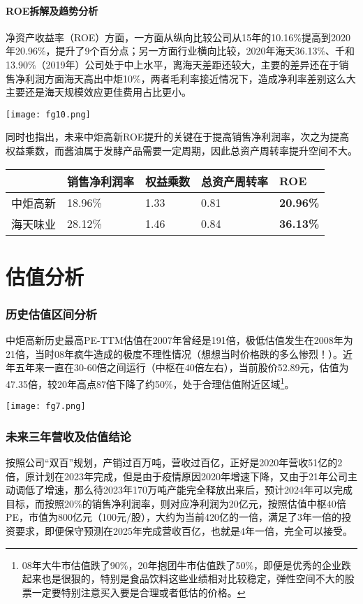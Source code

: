 \documentclass[UTF8,a4paper,zihao=-4,fontset = windows]{ctexart} %
\begin{document}
\subsection{ROE拆解及趋势分析}
净资产收益率（ROE）方面，一方面从纵向比较公司从15年的10.16\%提高到2020年20.96\%，提升了9个百分点；另一方面行业横向比较，2020年海天36.13\%、千和13.90\%（2019年）公司处于中上水平，离海天差距还较大，主要的差异还在于销售净利润方面海天高出中炬10\%，两者毛利率接近情况下，造成净利率差别这么大主要还是海天规模效应更佳费用占比更小。

\texttt{[image: fg10.png]} 

同时也指出，未来中炬高新ROE提升的关键在于提高销售净利润率，次之为提高权益乘数，而酱油属于发酵产品需要一定周期，因此总资产周转率提升空间不大。

\begin{tabular}{rllll}
    \multicolumn{1}{l}{\textbf{}} & \textbf{销售净利润率} & \textbf{权益乘数} & \textbf{总资产周转率} & \textbf{ROE}     \\
    \hline
    中炬高新                          & 18.96\%         & 1.33          & 0.81            & \textbf{20.96\%} \\
    海天味业                          & 28.12\%         & 1.46          & 0.84            & \textbf{36.13\%} \\
    \hline
    \end{tabular}

\part{估值分析}
\section{历史估值区间分析}
中炬高新历史最高PE-TTM估值在2007年曾经是191倍，极低估值发生在2008年为21倍，当时08年疯牛造成的极度不理性情况（想想当时价格跌的多么惨烈！）。近年五年来一直在30-60倍之间运行（中枢在40倍左右），当前股价52.89元，估值为47.35倍，较20年高点87倍下降了约50\%，处于合理估值附近区域\footnote{08年大牛市估值跌了90\%，20年抱团牛市估值跌了50\%，即便是优秀的企业跌起来也是很狠的，特别是食品饮料这些业绩相对比较稳定，弹性空间不大的股票一定要特别注意买入要是合理或者低估的价格。}。

\texttt{[image: fg7.png]} 

\section{未来三年营收及估值结论}
按照公司“双百”规划，产销过百万吨，营收过百亿，正好是2020年营收51亿的2倍，原计划在2023年完成，但是由于疫情原因2020年增速下降，又由于21年公司主动调低了增速，那么待2023年170万吨产能完全释放出来后，预计2024年可以完成目标，而按照20\%的销售净利润率，则对应净利润为20亿元，按照估值中枢40倍PE，市值为800亿元（100元/股），大约为当前420亿的一倍，满足了3年一倍的投资要求，即便保守预测在2025年完成营收百亿，也就是4年一倍，完全可以接受。
\end{document}
